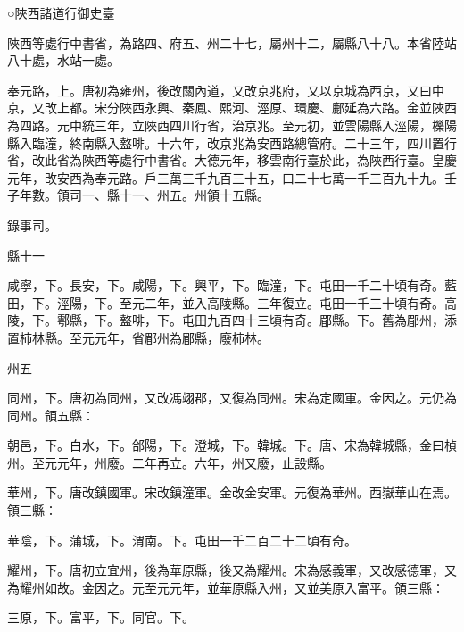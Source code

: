 
\begin{pinyinscope}

 ○陜西諸道行御史臺



 陜西等處行中書省，為路四、府五、州二十七，屬州十二，屬縣八十八。本省陸站八十處，水站一處。



 奉元路，上。唐初為雍州，後改關內道，又改京兆府，又以京城為西京，又曰中京，又改上都。宋分陜西永興、秦鳳、熙河、涇原、環慶、鄜延為六路。金並陜西為四路。元中統三年，立陜西四川行省，治京兆。至元初，並雲陽縣入涇陽，櫟陽縣入臨潼，終南縣入盩啡。十六年，改京兆為安西路總管府。二十三年，四川置行省，改此省為陜西等處行中書省。大德元年，移雲南行臺於此，為陜西行臺。皇慶元年，改安西為奉元路。戶三萬三千九百三十五，口二十七萬一千三百九十九。壬子年數。領司一、縣十一、州五。州領十五縣。



 錄事司。



 縣十一



 咸寧，下。長安，下。咸陽，下。興平，下。臨潼，下。屯田一千二十頃有奇。藍田，下。涇陽，下。至元二年，並入高陵縣。三年復立。屯田一千三十頃有奇。高陵，下。鄠縣，下。盩啡，下。屯田九百四十三頃有奇。郿縣。下。舊為郿州，添置柿林縣。至元元年，省郿州為郿縣，廢柿林。



 州五



 同州，下。唐初為同州，又改馮翊郡，又復為同州。宋為定國軍。金因之。元仍為同州。領五縣：



 朝邑，下。白水，下。郃陽，下。澄城，下。韓城。下。唐、宋為韓城縣，金曰楨州。至元元年，州廢。二年再立。六年，州又廢，止設縣。



 華州，下。唐改鎮國軍。宋改鎮潼軍。金改金安軍。元復為華州。西嶽華山在焉。領三縣：



 華陰，下。蒲城，下。渭南。下。屯田一千二百二十二頃有奇。



 耀州，下。唐初立宜州，後為華原縣，後又為耀州。宋為感義軍，又改感德軍，又為耀州如故。金因之。元至元元年，並華原縣入州，又並美原入富平。領三縣：



 三原，下。富平，下。同官。下。




\end{pinyinscope}
